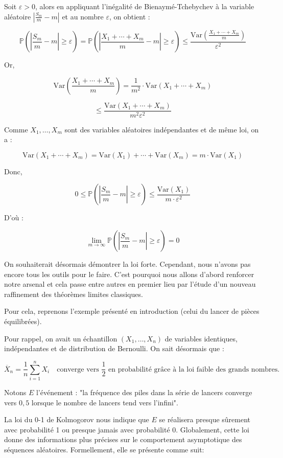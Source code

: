 \documentclass{article}
\begin{document}
\vspace{0.3cm}
\noindent
Soit $\varepsilon > 0$, alors en appliquant l'inégalité de Bienaymé-Tchebychev à la variable aléatoire $\left| \frac{S_m}{m} - m \right|$ et au nombre $\varepsilon$, on obtient :

\[
\mathbb{P}\left(\left| \frac{S_m}{m} - m \right| \geq \varepsilon\right) = \mathbb{P}\left(\left| \frac{X_1 + \cdots + X_m}{m} - m \right| \geq \varepsilon\right) \leq \frac{\text{Var}\left(\frac{X_1 + \cdots + X_m}{m}\right)}{\varepsilon^2}
\]

Or,

\[
\text{Var}\left(\frac{X_1 + \cdots + X_m}{m}\right) = \frac{1}{m^2} \cdot \text{Var}(X_1 + \cdots + X_m)
\]

\[
\leq \frac{\text{Var}(X_1 + \cdots + X_m)}{m^2 \varepsilon^2}
\]

Comme $X_1, \ldots, X_m$ sont des variables aléatoires indépendantes et de même loi, on a :

\[
\text{Var}(X_1 + \cdots + X_m) = \text{Var}(X_1) + \cdots + \text{Var}(X_m) = m \cdot \text{Var}(X_1)
\]

Donc,

\[
0 \leq \mathbb{P}\left(\left| \frac{S_m}{m} - m \right| \geq \varepsilon\right) \leq \frac{\text{Var}(X_1)}{m \cdot \varepsilon^2}
\]

D'où :

\[
\lim_{m \to \infty} \mathbb{P}\left(\left| \frac{S_m}{m} - m \right| \geq \varepsilon\right) = 0
\]

\vspace{1cm}

\begin{justify}
\noindent
On souhaiterait désormais démontrer la loi forte. Cependant, nous n'avons pas encore tous les outils pour le faire. C'est pourquoi nous allons d'abord renforcer notre arsenal et cela passe entre autres en premier lieu par l'étude d'un nouveau raffinement des théorèmes limites classiques.
\end{justify}

\begin{justify}
\noindent
Pour cela, reprenons l'exemple présenté en introduction (celui du lancer de pièces équilibrées).

\noindent
Pour rappel, on avait un échantillon $(X_1, \ldots, X_n)$ de variables identiques, indépendantes et de distribution de Bernoulli. On sait désormais que :

\[
\overline{X}_n = \frac{1}{n} \sum_{i=1}^n X_i \quad \text{converge vers } \frac{1}{2} \text{ en probabilité grâce à la loi faible des grands nombres.}
\]

\noindent
Notons $E$ l'événement : "la fréquence des piles dans la série de lancers converge vers $0,5$ lorsque le nombre de lancers tend vers l'infini".

\vspace{0.5cm}
\noindent
La loi du 0-1 de Kolmogorov nous indique que $E$ se réalisera presque sûrement avec probabilité 1 ou presque jamais avec probabilité 0. Globalement, cette loi donne des informations plus précises sur le comportement asymptotique des séquences aléatoires. Formellement, elle se présente comme suit: 
\end{justify}
\end{document}
